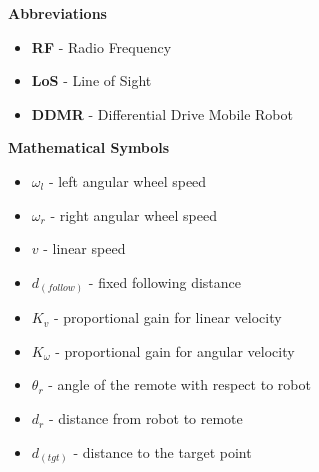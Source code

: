 
\renewcommand{\nomname}{Nomenclature}
\renewcommand{\nomAname}{\textbf{\large Abbreviations}}
\renewcommand{\nomGname}{\textbf{\large Mathematical Symbols}}
\renewcommand{\nomXname}{\textbf{\large Superscripts}}
\renewcommand{\nomZname}{\textbf{\large Subscripts}}

\printnomenclature
\cleardoublepage
{} %


\nomAname
\begin{itemize}
    \item[]\textbf{RF} - Radio Frequency
    \item[]\textbf{LoS} - Line of Sight
    \item[]\textbf{DDMR} - Differential Drive Mobile Robot
      
\end{itemize}
\bigbreak

\nomGname
\begin{itemize}
	\item[]$\omega_l$ - left angular wheel speed
	\item[]$\omega_r$ - right angular wheel speed
	\item[]$v$ - linear speed
	\item[]$d_(follow)$ - fixed following distance 
    \item[]$K_v$ - proportional gain for linear velocity
    \item[]$K_\omega$ - proportional gain for angular velocity
    \item[]$\theta_r$ - angle of the remote with respect to robot
    \item[]$d_r$ - distance from robot to remote
    \item[]$d_(tgt)$ - distance to the target point

\end{itemize}


